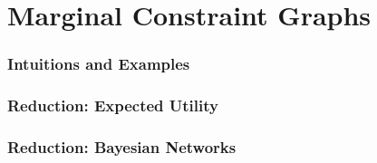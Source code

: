 \documentclass{article}
\begin{document}

%	
%	
%	
	
	


	\clearpage
	\part{Marginal Constraint Graphs}
	\section{Intuitions and Examples}
	




	
		


	\section{Reduction: Expected Utility}
	\section{Reduction: Bayesian Networks}
\end{document}
